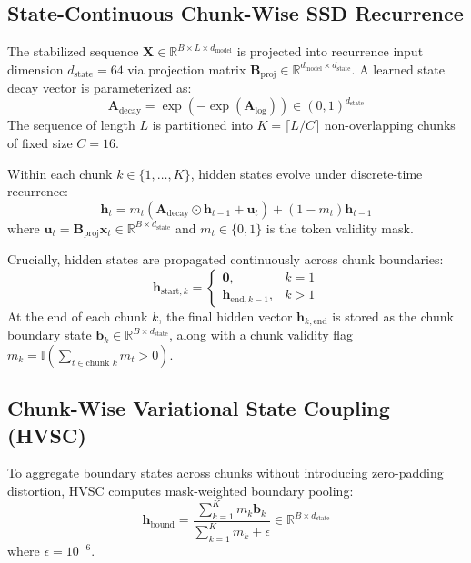 \documentclass[11pt,journal,onecolumn,draftcls]{IEEEtran}
\begin{document}
\subsection{State-Continuous Chunk-Wise SSD Recurrence}
The stabilized sequence $\mathbf{X} \in \mathbb{R}^{B \times L \times d_{\text{model}}}$ is projected into recurrence input dimension $d_{\text{state}} = 64$ via projection matrix $\mathbf{B}_{\text{proj}} \in \mathbb{R}^{d_{\text{model}} \times d_{\text{state}}}$. A learned state decay vector is parameterized as:
\begin{equation}
\mathbf{A}_{\text{decay}} = \exp(-\exp(\mathbf{A}_{\text{log}})) \in (0, 1)^{d_{\text{state}}}
\end{equation}
The sequence of length $L$ is partitioned into $K = \lceil L / C \rceil$ non-overlapping chunks of fixed size $C = 16$.

Within each chunk $k \in \{1, \dots, K\}$, hidden states evolve under discrete-time recurrence:
\begin{equation}
\mathbf{h}_{t} = m_t \left( \mathbf{A}_{\text{decay}} \odot \mathbf{h}_{t-1} + \mathbf{u}_t \right) + (1 - m_t) \mathbf{h}_{t-1}
\end{equation}
where $\mathbf{u}_t = \mathbf{B}_{\text{proj}} \mathbf{x}_t \in \mathbb{R}^{B \times d_{\text{state}}}$ and $m_t \in \{0, 1\}$ is the token validity mask.

Crucially, hidden states are propagated continuously across chunk boundaries:
\begin{equation}
\mathbf{h}_{\text{start}, k} = \begin{cases} \mathbf{0}, & k = 1 \\ \mathbf{h}_{\text{end}, k-1}, & k > 1 \end{cases}
\end{equation}
At the end of each chunk $k$, the final hidden vector $\mathbf{h}_{k, \text{end}}$ is stored as the chunk boundary state $\mathbf{b}_k \in \mathbb{R}^{B \times d_{\text{state}}}$, along with a chunk validity flag $m_k = \mathbb{I}(\sum_{t \in \text{chunk } k} m_t > 0)$.

\subsection{Chunk-Wise Variational State Coupling (HVSC)}
To aggregate boundary states across chunks without introducing zero-padding distortion, HVSC computes mask-weighted boundary pooling:
\begin{equation}
\mathbf{h}_{\text{bound}} = \frac{\sum_{k=1}^K m_k \mathbf{b}_k}{\sum_{k=1}^K m_k + \epsilon} \in \mathbb{R}^{B \times d_{\text{state}}}
\end{equation}
where $\epsilon = 10^{-6}$.
\end{document}
